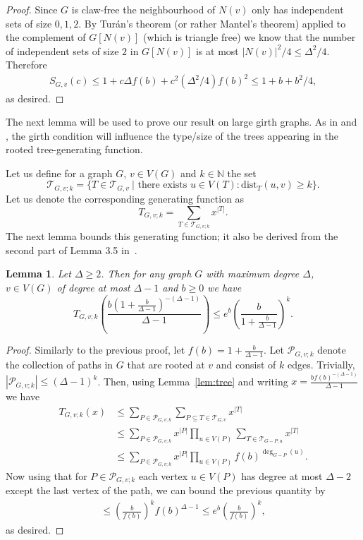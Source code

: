 \documentclass[a4paper,11pt,reqno]{amsart}
\newtheorem{lemma}[corollary]{Lemma}
\numberwithin{equation}{section}
\begin{document}
\begin{proof}
Since $G$ is claw-free the neighbourhood of $N(v)$ only has independent sets of size $0,1,2$. 
By Tur\'an's theorem (or rather Mantel's theorem) applied to the complement of $G[N(v)]$ (which is triangle free) we know that the number of independent sets of size $2$ in $G[N(v)]$ is at most $|N(v)|^2/4\leq \Delta^2/4$.
Therefore 
\begin{align*}
 S_{G,v}(c)\leq 1+c\Delta f(b)+c^2(\Delta^2/4) f(b)^2\leq 1+b+b^2/4,
\end{align*}
as desired.
\end{proof}






The next lemma will be used to prove our result on large girth graphs. As in \cite{JPR24} and \cite{procacci2024zero}, the girth condition will influence the type/size of the trees appearing in the rooted tree-generating function. 

Let us define for a graph $G$, $v\in V(G)$ and $k\in \mathbb{N}$ the set 
\[
    \mathcal{T}_{G,v;k}=\{T\in \mathcal{T}_{G,v} ~|\text{ there exists } u\in V(T): \textrm{dist}_{T}(u,v)\ge k\}.
\]
Let us denote the corresponding generating function as
\[
    T_{G,v;k}=\sum_{T\in\mathcal{T}_{G,v;k}}x^{|T|}.
\]
The next lemma bounds this generating function; it also be derived from the second part of Lemma 3.5 in~\cite{procacci2024zero}.
\begin{lemma}\label{lem:large_rooted_tree}
Let $\Delta\ge 2$. Then for any graph $G$ with maximum degree $\Delta$, $v\in V(G)$ of degree at most $\Delta-1$ and $b\ge 0$ we have 
\[
T_{G,v;k}\left(\frac{b\left(1+\tfrac{b}{\Delta-1}\right)^{-(\Delta-1)}}{\Delta-1}\right)\leq e^b \left(\frac{b}{1+\tfrac{b}{\Delta-1}}\right)^k.
\]
\end{lemma}
\begin{proof}
Similarly to the previous proof, let $f(b)=1+\tfrac{b}{\Delta-1}$. 
Let $\mathcal{P}_{G,v;k}$ denote the collection of paths in $G$ that are rooted at $v$ and consist of $k$ edges. Trivially, $|\mathcal{P}_{G,v;k}|\le (\Delta-1)^{k}$. Then, using Lemma~\ref{lem:tree} and writing $x=\tfrac{bf(b)^{-(\Delta-1)}}{\Delta-1}$ we have
\begin{align*}
T_{G,v; k}(x)&\le \sum_{P\in \mathcal{P}_{G,v;k}}\sum_{P\subseteq T\in\mathcal{T}_{G,v}}x^{|T|}\\
&\le \sum_{P\in \mathcal{P}_{G,v;k}}x^{|P|}\prod_{u\in V(P)}\sum_{T\in\mathcal{T}_{G-P,u}}x^{|T|}\\
&\le \sum_{P\in \mathcal{P}_{G,v;k}}x^{|P|}\prod_{u\in V(P)}f(b)^{\deg_{G-P}(u)}.
\end{align*}
Now using that for $P\in \mathcal{P}_{G,v;k}$ each vertex $u\in V(P)$ has degree at most $\Delta-2$ except the last vertex of the path, we can bound the previous quantity by
\begin{align*}
\le\left(\tfrac{b}{f(b)}\right)^kf(b)^{\Delta-1}\leq e^b \left(\tfrac{b}{f(b)}\right)^k,
\end{align*}
as desired.

\end{proof}
\end{document}
